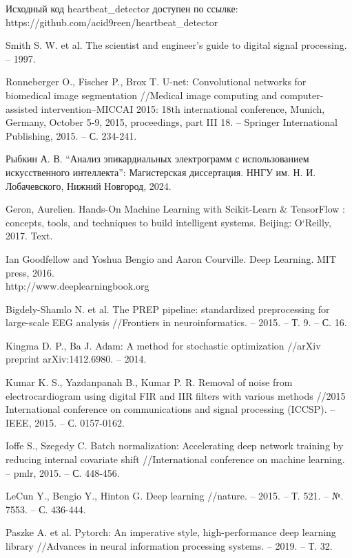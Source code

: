 \begin{thebibliography}{00}
	Исходный код heartbeat\_detector доступен по ссылке:\\
	https://github.com/acid9reen/heartbeat\_detector

	Smith S. W. et al. The scientist and engineer's guide to digital signal processing. -- 1997.

	Ronneberger O., Fischer P., Brox T. U-net: Convolutional networks for
	biomedical image segmentation //Medical image computing and
	computer-assisted intervention–MICCAI 2015: 18th international conference,
	Munich, Germany, October 5-9, 2015, proceedings, part III 18. – Springer
	International Publishing, 2015. – С. 234-241.

	 Рыбкин А. В. ``Анализ эпикардиальных электрограмм с
	использованием искусственного интеллекта'': Магистерская диссертация. ННГУ
	им. Н. И. Лобачевского, Нижний Новгород, 2024.

	Geron, Aurelien. Hands-On Machine Learning with Scikit-Learn \& TensorFlow
	: concepts, tools, and techniques to build intelligent systems. Beijing:
	O`Reilly, 2017. Text.

	Ian Goodfellow and Yoshua Bengio and Aaron Courville. Deep Learning. MIT
	press, 2016.\\ http://www.deeplearningbook.org

	Bigdely-Shamlo N. et al. The PREP pipeline: standardized preprocessing for
	large-scale EEG analysis //Frontiers in neuroinformatics. – 2015. – Т. 9. –
	С. 16.

	Kingma D. P., Ba J. Adam: A method for stochastic optimization //arXiv
	preprint arXiv:1412.6980. – 2014.

	Kumar K. S., Yazdanpanah B., Kumar P. R. Removal of noise from
	electrocardiogram using digital FIR and IIR filters with various methods
	//2015 International conference on communications and signal processing
	(ICCSP). – IEEE, 2015. – С. 0157-0162.

	Ioffe S., Szegedy C. Batch normalization: Accelerating deep network
	training by reducing internal covariate shift //International conference on
	machine learning. – pmlr, 2015. – С. 448-456.

	LeCun Y., Bengio Y., Hinton G. Deep learning //nature. – 2015. – Т. 521. –
	№. 7553. – С. 436-444.

	Paszke A. et al. Pytorch: An imperative style, high-performance deep
	learning library //Advances in neural information processing systems. –
	2019. – Т. 32.


\end{thebibliography}
